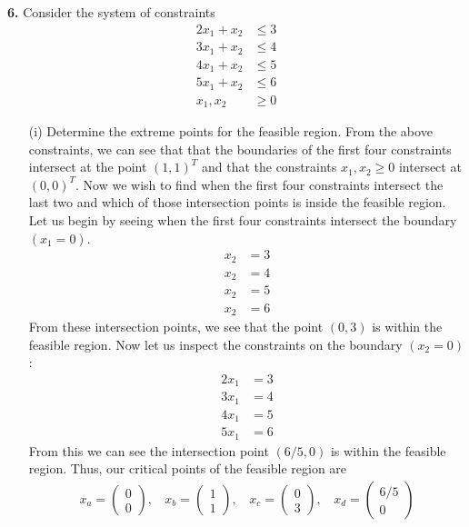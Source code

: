 \documentclass{article}
\begin{document}
\textbf{6.} Consider the system of constraints
\begin{align*}
    2x_1 + x_2 &\leq 3\\
    3x_1 + x_2 &\leq 4\\
    4x_1 + x_2 &\leq 5\\
    5x_1 + x_2 &\leq 6\\
    x_1,x_2 &\geq 0
\end{align*}
\begin{itemize}
    \item[(i)] Determine the extreme points for the feasible region.
    \newline\newline
    From the above constraints, we can see that that the boundaries of the first four constraints intersect at the point $(1,1)^T$ and that the constraints $x_1, x_2 \geq 0$ intersect at $(0,0)^T$. Now we wish to find when the first four constraints intersect the last two and which of those intersection points is inside the feasible region. Let us begin by seeing when the first four constraints intersect the boundary $(x_1 = 0)$.
    \begin{align*}
        x_2 &= 3\\
        x_2 &= 4\\
        x_2 &= 5\\
        x_2 &= 6
    \end{align*}
    From these intersection points, we see that the point $(0,3)$ is within the feasible region. Now let us inspect the constraints on the boundary $(x_2 = 0)$:
    \begin{align*}
        2x_1 &= 3\\
        3x_1 &= 4\\
        4x_1 &= 5\\
        5x_1 &= 6
    \end{align*}
    From this we can see the intersection point $(6/5, 0)$ is within the feasible region. Thus, our critical points of the feasible region are
    \begin{align*}
        x_a = \begin{pmatrix}
            0\\
            0
        \end{pmatrix}
        ,\:\:\:\:
        x_b = \begin{pmatrix}
            1\\
            1
        \end{pmatrix}
        ,\:\:\:\:
        x_c = \begin{pmatrix}
            0\\
            3
        \end{pmatrix}
        ,\:\:\:\:
        x_d = \begin{pmatrix}
            6/5\\
            0
        \end{pmatrix}
    \end{align*}


\end{itemize}
\end{document}
